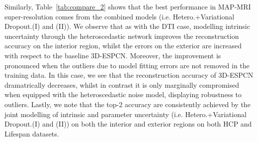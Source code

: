 
Similarly, Table~\ref{tab:compare_2} shows that the best performance in MAP-MRI super-resolution comes from the combined models (i.e. Hetero.+Variational Dropout.(I) and (II)). We observe that as with the DTI case,  modelling intrinsic uncertainty through the heteroscedastic network improves the reconstruction accuracy on the interior region, whilst the errors on the exterior are increased with respect to the baseline 3D-ESPCN. Moreover, the improvement is pronounced when the outliers due to model fitting errors are not removed in the training data. In this case, we see that the reconstruction accuracy of 3D-ESPCN dramatrically decreases, whilst in contrast it is only marginally compromised when equipped with the heteroscedastic noise model, displaying robustness to outliers. Lastly, we note that the top-2 accuracy are consistently achieved by the joint modelling of intrinsic and parameter uncertainty (i.e. Hetero.+Variational Dropout.(I) and (II)) on both the interior and exterior regions on both HCP and Lifespan datasets.  


